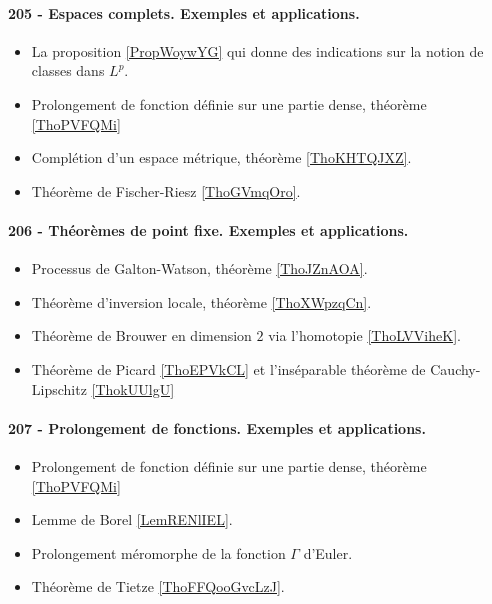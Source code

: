 \paragraph{205 - Espaces complets. Exemples et applications.}
\begin{itemize}
    \item La proposition \ref{PropWoywYG} qui donne des indications sur la notion de classes dans \( L^p\).
    \item Prolongement de fonction définie sur une partie dense, théorème \ref{ThoPVFQMi}
    \item Complétion d'un espace métrique, théorème \ref{ThoKHTQJXZ}.
    \item Théorème de Fischer-Riesz \ref{ThoGVmqOro}.
\end{itemize}
\paragraph{206 - Théorèmes de point fixe. Exemples et applications.}
\begin{itemize}
    \item Processus de Galton-Watson, théorème \ref{ThoJZnAOA}.
    \item Théorème d'inversion locale, théorème \ref{ThoXWpzqCn}.
    \item Théorème de Brouwer en dimension \( 2\) via l'homotopie \ref{ThoLVViheK}.
    \item Théorème de Picard \ref{ThoEPVkCL} et l'inséparable théorème de Cauchy-Lipschitz \ref{ThokUUlgU}
\end{itemize}
\paragraph{207 - Prolongement de fonctions. Exemples et applications.}
\begin{itemize}
    \item Prolongement de fonction définie sur une partie dense, théorème \ref{ThoPVFQMi}
    \item Lemme de Borel \ref{LemRENlIEL}.
    \item Prolongement méromorphe de la fonction \( \Gamma\) d'Euler.
    \item Théorème de Tietze \ref{ThoFFQooGvcLzJ}.
\end{itemize}
